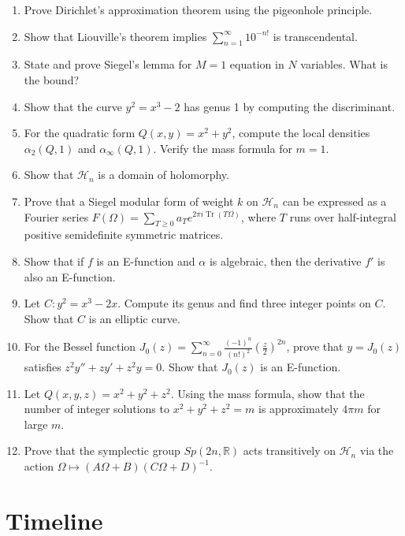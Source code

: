 \begin{enumerate}
    \item [B] Prove Dirichlet's approximation theorem using the pigeonhole principle.
    \item [B] Show that Liouville's theorem implies $\sum_{n=1}^\infty 10^{-n!}$ is transcendental.
    \item [I] State and prove Siegel's lemma for $M=1$ equation in $N$ variables. What is the bound?
    \item [B] Show that the curve $y^2 = x^3 - 2$ has genus 1 by computing the discriminant.
    \item [I] For the quadratic form $Q(x,y) = x^2 + y^2$, compute the local densities $\alpha_2(Q,1)$ and $\alpha_\infty(Q,1)$. Verify the mass formula for $m=1$.
    \item [I] Show that $\mathcal{H}_n$ is a domain of holomorphy.
    \item [A] Prove that a Siegel modular form of weight $k$ on $\mathcal{H}_n$ can be expressed as a Fourier series $F(\Omega) = \sum_{T \geq 0} a_T e^{2\pi i \operatorname{Tr}(T\Omega)}$, where $T$ runs over half-integral positive semidefinite symmetric matrices.
    \item [I] Show that if $f$ is an E-function and $\alpha$ is algebraic, then the derivative $f'$ is also an E-function.
    \item [B] Let $C: y^2 = x^3 - 2x$. Compute its genus and find three integer points on $C$. Show that $C$ is an elliptic curve.
    \item [I] For the Bessel function $J_0(z) = \sum_{n=0}^\infty \frac{(-1)^n}{(n!)^2} \left(\frac{z}{2}\right)^{2n}$, prove that $y = J_0(z)$ satisfies $z^2 y'' + z y' + z^2 y = 0$. Show that $J_0(z)$ is an E-function.
    \item [I] Let $Q(x,y,z) = x^2 + y^2 + z^2$. Using the mass formula, show that the number of integer solutions to $x^2 + y^2 + z^2 = m$ is approximately $4\pi m$ for large $m$.
    \item [I] Prove that the symplectic group $Sp(2n,\mathbb{R})$ acts transitively on $\mathcal{H}_n$ via the action $\Omega \mapsto (A\Omega + B)(C\Omega + D)^{-1}$.
\end{enumerate}

\section*{Timeline}

